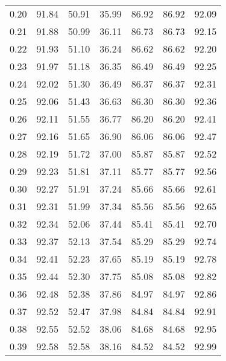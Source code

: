 \begin{tabular}{|c|c|c|c|c|c|c|}
      0.20 &     91.84 &     50.91 &      35.99 &   86.92 &      86.92 &         92.09 \\
      0.21 &     91.88 &     50.99 &      36.11 &   86.73 &      86.73 &         92.15 \\
      0.22 &     91.93 &     51.10 &      36.24 &   86.62 &      86.62 &         92.20 \\
      0.23 &     91.97 &     51.18 &      36.35 &   86.49 &      86.49 &         92.25 \\
      0.24 &     92.02 &     51.30 &      36.49 &   86.37 &      86.37 &         92.31 \\
      0.25 &     92.06 &     51.43 &      36.63 &   86.30 &      86.30 &         92.36 \\
      0.26 &     92.11 &     51.55 &      36.77 &   86.20 &      86.20 &         92.41 \\
      0.27 &     92.16 &     51.65 &      36.90 &   86.06 &      86.06 &         92.47 \\
      0.28 &     92.19 &     51.72 &      37.00 &   85.87 &      85.87 &         92.52 \\
      0.29 &     92.23 &     51.81 &      37.11 &   85.77 &      85.77 &         92.56 \\
      0.30 &     92.27 &     51.91 &      37.24 &   85.66 &      85.66 &         92.61 \\
      0.31 &     92.31 &     51.99 &      37.34 &   85.56 &      85.56 &         92.65 \\
      0.32 &     92.34 &     52.06 &      37.44 &   85.41 &      85.41 &         92.70 \\
      0.33 &     92.37 &     52.13 &      37.54 &   85.29 &      85.29 &         92.74 \\
      0.34 &     92.41 &     52.23 &      37.65 &   85.19 &      85.19 &         92.78 \\
      0.35 &     92.44 &     52.30 &      37.75 &   85.08 &      85.08 &         92.82 \\
      0.36 &     92.48 &     52.38 &      37.86 &   84.97 &      84.97 &         92.86 \\
      0.37 &     92.52 &     52.47 &      37.98 &   84.84 &      84.84 &         92.91 \\
      0.38 &     92.55 &     52.52 &      38.06 &   84.68 &      84.68 &         92.95 \\
      0.39 &     92.58 &     52.58 &      38.16 &   84.52 &      84.52 &         92.99 \\

\end{tabular}
